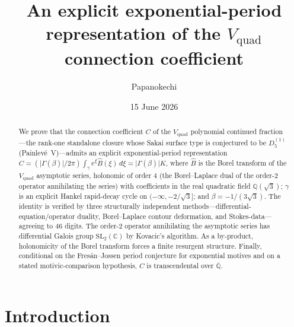 \documentclass[11pt,reqno]{amsart}
\title[An exponential-period representation of the $V_{\mathrm{quad}}$ constant]%
{An explicit exponential-period representation of the $V_{\mathrm{quad}}$ connection coefficient}
\author{Papanokechi}
\date{15 June 2026}
\renewcommand{\_}{\vquadorigunderscore\allowbreak}
\theoremstyle{plain}
\theoremstyle{definition}
\newcommand{\Vquad}{V_{\mathrm{quad}}}
\newcommand{\Bhat}{\widehat{B}}
\newcommand{\Qsqrt}{\mathbb{Q}(\sqrt3)}
\newcommand{\Qbar}{\overline{\mathbb{Q}}}
\newcommand{\SL}{\mathrm{SL}}
\begin{document}
\begin{abstract}
We prove that the connection coefficient $C$ of the $\Vquad$ polynomial continued fraction---the
rank-one standalone closure whose Sakai surface type is conjectured to be $D_5^{(1)}$
(Painlev\'e~V)---admits an explicit
exponential-period representation
$C=(\lvert\Gamma(\beta)\rvert/2\pi)\int_\gamma e^{\xi}\Bhat(\xi)\,d\xi=\lvert\Gamma(\beta)\rvert K$,
where $\Bhat$ is the Borel transform of the $\Vquad$ asymptotic series, holonomic of order $4$
(the Borel--Laplace dual of the order-$2$ operator annihilating the series)
with coefficients in the real quadratic field $\Qsqrt$; $\gamma$ is an explicit Hankel
rapid-decay cycle on $(-\infty,-2/\sqrt3]$; and $\beta=-1/(3\sqrt3)$. The identity is verified by
three structurally independent methods---differential-equation/operator duality, Borel--Laplace
contour deformation, and Stokes-data---agreeing to $46$ digits. The order-$2$ operator annihilating
the asymptotic series has differential Galois group $\SL_2(\mathbb{C})$ by Kovacic's algorithm.
As a by-product, holonomicity of the Borel transform forces a finite resurgent structure. Finally,
conditional on the Fres\'an--Jossen period conjecture for exponential motives and on a stated
motivic-comparison hypothesis, $C$ is transcendental over $\Qbar$.
\end{abstract}
\maketitle

\section{Introduction}\label{sec:intro}
\end{document}
